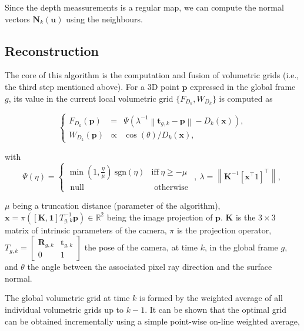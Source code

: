 Since the depth meassurements is a regular map, we can compute the normal vectors $\mathbf{N}_k(\mathbf{u})$ using the neighbours.



\subsection{Reconstruction}
The core of this algorithm is the computation and fusion of volumetric grids (i.e., the third step mentioned above). For a 3D point $\mathbf{p}$ expressed in the global frame $g$, its value in the current local volumetric grid $\{F_{D_k},W_{D_k}\}$ is computed as

$$
\left\{
\begin{array}{ccc}
F_{D_{k}}(\mathbf{p}) &=& \Psi (\lambda^{-1} \left \| \mathbf{t}_{g,k} - \mathbf{p}\right \| - D_k(\mathbf{x})), \\
W_{D_{k}}(\mathbf{p}) &\propto& \cos(\theta)/D_{k}(\mathbf{x}),
\end{array}
\right.
$$

with
$$
\Psi (\eta) =
\left \{
\begin{array}{cc}
\min(1,\frac{\eta}{\mu}) ~\text{sgn}(\eta) & \text{iff} ~ \eta \geq -\mu \\
\mbox{ null } & \mbox{ otherwise }
\end{array}
\right. , ~
\lambda = \left \| \mathbf{K}^{-1} [\mathbf{x}^\top 1]^\top \right \|,~
$$

$\mu$ being a truncation distance (parameter of the algorithm), $\mathbf{x} = \pi([\mathbf{K},\mathbf 1] T^{-1}_{g,k} \mathbf{p}) \in \mathbb{R}^2$ being the image projection of $\mathbf p$. $\mathbf{K}$ is the $3\times 3$ matrix of intrinsic parameters of the camera, $\pi$ is the projection operator, $T_{g,k} = \left[ \begin{matrix} \mathbf{R}_{g,k} & \mathbf{t}_{g,k} \\ 0 & 1 \end{matrix} \right]$ the pose of the camera, at time $k$, in the global frame $g$, and $\theta$ the angle between the associated pixel ray direction and the surface normal.

The global volumetric grid at time $k$ is formed by the weighted average of all individual volumetric grids up to $k-1$. It can be shown that the optimal grid can be obtained incrementally using a simple point-wise on-line weighted average,


